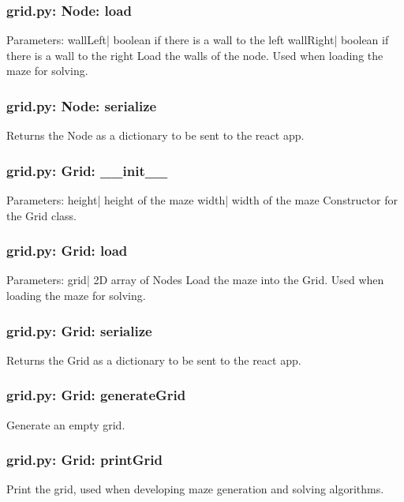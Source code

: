 \documentclass{article}
\begin{document}
\subsubsection{grid.py: Node: load}
Parameters:\newline
\indent wallLeft| boolean if there is a wall to the left\newline
\indent wallRight| boolean if there is a wall to the right\newline
Load the walls of the node. Used when loading the maze for solving.

\subsubsection{grid.py: Node: serialize}
Returns the Node as a dictionary to be sent to the react app.

\subsubsection{grid.py: Grid: \_\_init\_\_}
Parameters:\newline
\indent height| height of the maze\newline
\indent width| width of the maze\newline
Constructor for the Grid class.

\subsubsection{grid.py: Grid: load}
Parameters:\newline
\indent grid| 2D array of Nodes\newline
Load the maze into the Grid. Used when loading the maze for solving.

\subsubsection{grid.py: Grid: serialize}
Returns the Grid as a dictionary to be sent to the react app.


\subsubsection{grid.py: Grid: generateGrid}
Generate an empty grid.

\subsubsection{grid.py: Grid: printGrid}
Print the grid, used when developing maze generation and solving algorithms.
\end{document}
